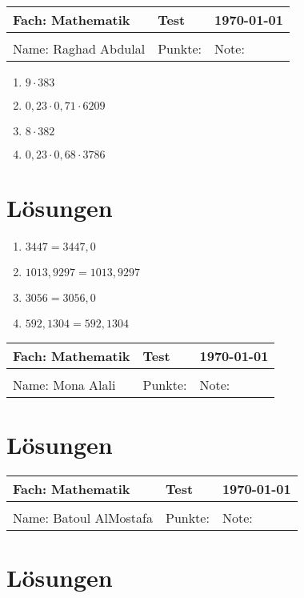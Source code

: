 \documentclass{article}%
\begin{document}
%
\normalsize%
\pagestyle{empty}%
\begin{tabular}{|p{5cm}|p{5cm}|p{5cm}|}%
\hline%
Fach: Mathematik&Test&\today\\%
\hline%
&&\\%
Name: Raghad Abdulal&Punkte: &Note: \\%
\hline%
\end{tabular}%
\begin{enumerate}%
\item%
$9 \cdot 383$%
\newline%
\item%
$0,23 \cdot 0,71 \cdot 6209$%
\newline%
\item%
$8 \cdot 382$%
\newline%
\item%
$0,23 \cdot 0,68 \cdot 3786$%
\newline%
\end{enumerate}%
\section*{Lösungen}%
\begin{enumerate}%
\item%
$3447 = 3447,0$%
\item%
$1013,9297 = 1013,9297$%
\item%
$3056 = 3056,0$%
\item%
$592,1304 = 592,1304$%
\end{enumerate}%
\newpage

%
\begin{tabular}{|p{5cm}|p{5cm}|p{5cm}|}%
\hline%
Fach: Mathematik&Test&\today\\%
\hline%
&&\\%
Name: Mona Alali&Punkte: &Note: \\%
\hline%
\end{tabular}%
%
\section*{Lösungen}%
%
\newpage

%
\begin{tabular}{|p{5cm}|p{5cm}|p{5cm}|}%
\hline%
Fach: Mathematik&Test&\today\\%
\hline%
&&\\%
Name: Batoul AlMostafa&Punkte: &Note: \\%
\hline%
\end{tabular}%
%
\section*{Lösungen}%
%
\newpage
\end{document}
